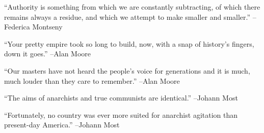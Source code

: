 \documentclass{article}%
\begin{document}
\begin{minipage}{\textwidth}%
\flushleft%
“Authority is something from which we are constantly subtracting, of which there remains always a residue, and which we attempt to make smaller and smaller.”%
\linebreak%
\vspace{1mm}%
–Federica Montseny%
\linebreak%
\vspace{1mm}%
\end{minipage}%
\linebreak%
\vspace{1mm}%
\begin{minipage}{\textwidth}%
\flushleft%
“Your pretty empire took so long to build, now, with a snap of history's fingers, down it goes.”%
\linebreak%
\vspace{1mm}%
–Alan Moore%
\linebreak%
\vspace{1mm}%
\end{minipage}%
\linebreak%
\vspace{1mm}%
\begin{minipage}{\textwidth}%
\flushleft%
“Our masters have not heard the people's voice for generations and it is much, much louder than they care to remember.”%
\linebreak%
\vspace{1mm}%
–Alan Moore%
\linebreak%
\vspace{1mm}%
\end{minipage}%
\linebreak%
\vspace{1mm}%
\begin{minipage}{\textwidth}%
\flushleft%
“The aims of anarchists and true communists are identical.”%
\linebreak%
\vspace{1mm}%
–Johann Most%
\linebreak%
\vspace{1mm}%
\end{minipage}%
\linebreak%
\vspace{1mm}%
\begin{minipage}{\textwidth}%
\flushleft%
“Fortunately, no country was ever more suited for anarchist agitation than present{-}day America.”%
\linebreak%
\vspace{1mm}%
–Johann Most%
\linebreak%
\vspace{1mm}%
\end{minipage}%
\end{document}
